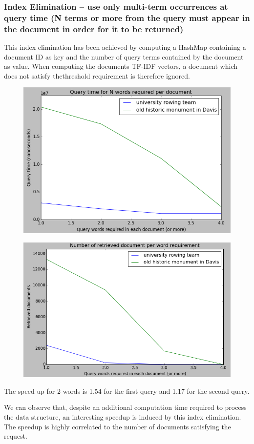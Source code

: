 \subsubsection{Index Elimination – use only multi-term occurrences at query time (N terms or more from the query must appear in the document in order for it to be returned)}
This index elimination has been achieved by computing a HashMap containing a document ID as key and the number of query terms contained by the document as value.
When computing the documents TF-IDF vectors, a document which does not satisfy thethreshold requirement is therefore ignored.

\begin{figure}[H]
\centering
\includegraphics[width=0.7\linewidth]{img/index_elimination_speedup.png}
\end{figure}

\begin{figure}[H]
\centering
\includegraphics[width=0.7\linewidth]{img/index_elimination_results.png}
\end{figure}

The speed up for 2 words is 1.54 for the first query and 1.17 for the second query.

We can observe that, despite an additional computation time required to process the data structure, an interesting speedup is induced by this index elimination. The speedup is highly correlated to the number of documents satisfying the request.

